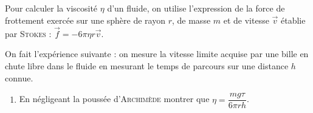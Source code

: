 \documentclass[a4paper,french,bookmarks]{book}
\begin{document}
    \subsection{}
    
    Pour calculer la viscosité $\eta$ d'un fluide, on utilise l'expression de la force de frottement exercée sur une sphère de rayon $r$, de masse $m$ et de vitesse $\vec{v}$ établie par \textsc{Stokes} : \quad $\vec{f} = -6\pi\eta r \vec{v}$.
    
    On fait l'expérience suivante : on mesure la vitesse limite acquise par une bille en chute libre dans le fluide en mesurant le temps de parcours sur une distance $h$ connue. 
    
    \begin{enumerate}
        \item En négligeant la poussée d'\textsc{Archimède} montrer que $\eta = \dfrac{mg\tau}{6\pi rh}$.
        
        \noafter
\end{enumerate}
\end{document}
